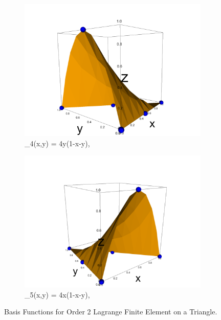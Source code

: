 \documentclass[12pt]{ociamthesis}
\begin{document}
\begin{figure}[H]
\begin{subfigure}{0.5\textwidth}
     \includegraphics[width=\textwidth]{Pics/BasisFunc/triBasis4.png}
     \caption{\phi_4(x,y) = 4y(1-x-y),}
 \end{subfigure}
 \hfill
 \begin{subfigure}{0.5\textwidth}
     \includegraphics[width=\textwidth]{Pics/BasisFunc/triBasis5.png}
     \caption{\phi_5(x,y) = 4x(1-x-y),}
 \end{subfigure}
 \hfill
 \caption{Basis Functions for Order 2 Lagrange Finite Element on a Triangle.} \label{triBasisFuncs}
\end{figure}
\end{document}
